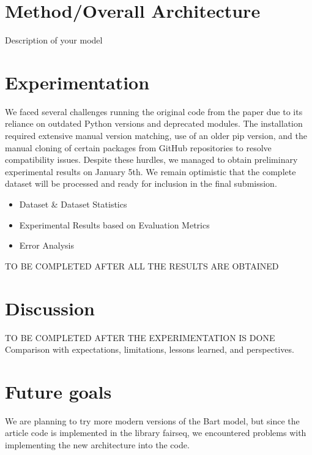 \documentclass[12pt,a4paper]{article}
\begin{document}
\section*{Method/Overall Architecture}

Description of your model

\section*{Experimentation}


We faced several challenges running the original code from the paper due to its reliance on outdated Python versions and deprecated modules. The installation required extensive manual version matching, use of an older pip version, and the manual cloning of certain packages from GitHub repositories to resolve compatibility issues. Despite these hurdles, we managed to obtain preliminary experimental results on January 5th. We remain optimistic that the complete dataset will be processed and ready for inclusion in the final submission.
\ \\
\begin{itemize}

\item Dataset \& Dataset Statistics
\item Experimental Results based on Evaluation Metrics
\item Error Analysis
\end{itemize}

TO BE COMPLETED AFTER ALL THE RESULTS ARE OBTAINED

\section*{Discussion}

TO BE COMPLETED AFTER THE EXPERIMENTATION IS DONE
\ \\

Comparison with expectations, limitations, lessons learned, and perspectives.



\section*{Future goals}
We are planning to try more modern versions of the Bart model, but since the article code is implemented in the library fairseq, we encountered problems with implementing the new architecture into the code.
\end{document}

